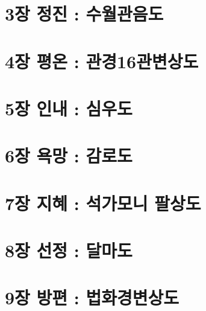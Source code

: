 \documentclass[aspectratio=1610,12pt,xcolor=pdftex,dvipsnames,table,handout]{beamer}
\begin{document}
	\section{	3장	정진	:	수월관음도		}
	\frame [plain] {\sectionpage}

%
	\section{	4장	평온	:	관경16관변상도		}
	\frame [plain] {\sectionpage}

%
	\section{	5장	인내	:	심우도		}
	\frame [plain] {\sectionpage}

%
	\section{	6장	욕망	:	감로도		}
	\frame [plain] {\sectionpage}

%
	\section{	7장	지혜	:	석가모니 팔상도		}
	\frame [plain] {\sectionpage}

%
	\section{	8장	선정	:	달마도		}
	\frame [plain] {\sectionpage}

%
	\section{	9장	방편	:	법화경변상도		}
	\frame [plain] {\sectionpage}
\end{document}
